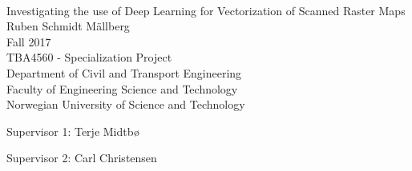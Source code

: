 
\thispagestyle{empty}
\mbox{}\\[6pc]
\begin{center}
\Huge{Investigating the use of Deep Learning for Vectorization of Scanned Raster Maps}\\[2pc]

\Large{Ruben Schmidt Mällberg}\\[1pc]
\large{Fall 2017}\\[2pc]

TBA4560 - Specialization Project\\
Department of Civil and Transport Engineering \\
Faculty of Engineering Science and Technology\\
Norwegian University of Science and Technology
\end{center}
\vfill

\noindent Supervisor 1: Terje Midtbø

\noindent Supervisor 2: Carl Christensen


